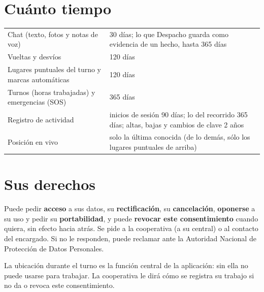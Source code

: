 \documentclass[10.5pt,a4paper]{article}
\begin{document}
\section{Cuánto tiempo}
\begin{tabularx}{\linewidth}{>{\raggedright}p{6.4cm}X}
\toprule
Chat (texto, fotos y notas de voz) & 30 días; lo que Despacho guarda como evidencia de un hecho, hasta 365 días\\
Vueltas y desvíos & 120 días\\
Lugares puntuales del turno y marcas automáticas & 120 días\\
Turnos (horas trabajadas) y emergencias (SOS) & 365 días\\
Registro de actividad & inicios de sesión 90 días; lo del recorrido 365 días; altas, bajas y cambios de clave 2 años\\
Posición en vivo & solo la última conocida (de lo demás, sólo los lugares puntuales de arriba)\\
\bottomrule
\end{tabularx}

\section{Sus derechos}
Puede pedir \textbf{acceso} a sus datos, su \textbf{rectificación}, su
\textbf{cancelación}, \textbf{oponerse} a su uso y pedir su
\textbf{portabilidad}, y puede \textbf{revocar este consentimiento} cuando
quiera, sin efecto hacia atrás. Se pide a la cooperativa (a su central) o al
contacto del encargado. Si no le responden, puede reclamar ante la Autoridad
Nacional de Protección de Datos Personales.

La ubicación durante el turno es la función central de la aplicación: sin
ella no puede usarse para trabajar. La cooperativa le dirá cómo se registra
su trabajo si no da o revoca este consentimiento.
\end{document}
